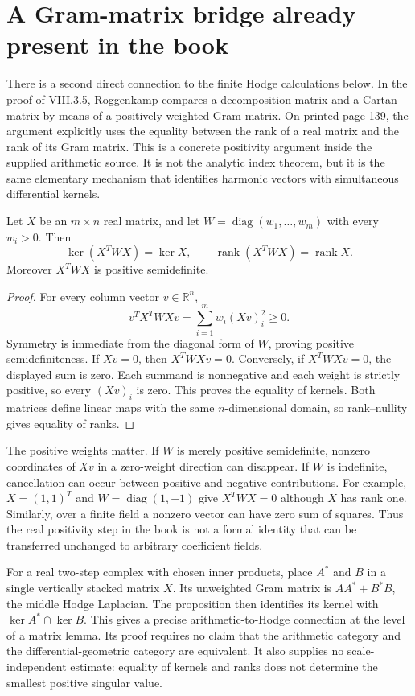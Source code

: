 \section{A Gram-matrix bridge already present in the book}

There is a second direct connection to the finite Hodge calculations below. In the proof of VIII.3.5, Roggenkamp compares a decomposition matrix and a Cartan matrix by means of a positively weighted Gram matrix. On printed page 139, the argument explicitly uses the equality between the rank of a real matrix and the rank of its Gram matrix. This is a concrete positivity argument inside the supplied arithmetic source. It is not the analytic index theorem, but it is the same elementary mechanism that identifies harmonic vectors with simultaneous differential kernels.\cite[Theorem VIII.3.5 and Exercise VIII.3.5]{v2Roggenkamp1970II}

\begin{proposition}
Let $X$ be an $m\times n$ real matrix, and let $W=\operatorname{diag}(w_1,\ldots,w_m)$ with every $w_i>0$. Then
\[
\ker(X^TWX)=\ker X,
\qquad
\operatorname{rank}(X^TWX)=\operatorname{rank}X.
\]
Moreover $X^TWX$ is positive semidefinite.
\end{proposition}
\begin{proof}
For every column vector $v\in\mathbb R^n$,
\[
v^TX^TWXv=\sum_{i=1}^m w_i(Xv)_i^2\geq0.
\]
Symmetry is immediate from the diagonal form of $W$, proving positive semidefiniteness. If $Xv=0$, then $X^TWXv=0$. Conversely, if $X^TWXv=0$, the displayed sum is zero. Each summand is nonnegative and each weight is strictly positive, so every $(Xv)_i$ is zero. This proves the equality of kernels. Both matrices define linear maps with the same $n$-dimensional domain, so rank--nullity gives equality of ranks.
\end{proof}

The positive weights matter. If $W$ is merely positive semidefinite, nonzero coordinates of $Xv$ in a zero-weight direction can disappear. If $W$ is indefinite, cancellation can occur between positive and negative contributions. For example, $X=(1,1)^T$ and $W=\operatorname{diag}(1,-1)$ give $X^TWX=0$ although $X$ has rank one. Similarly, over a finite field a nonzero vector can have zero sum of squares. Thus the real positivity step in the book is not a formal identity that can be transferred unchanged to arbitrary coefficient fields.

For a real two-step complex with chosen inner products, place $A^*$ and $B$ in a single vertically stacked matrix $X$. Its unweighted Gram matrix is $AA^*+B^*B$, the middle Hodge Laplacian. The proposition then identifies its kernel with $\ker A^*\cap\ker B$. This gives a precise arithmetic-to-Hodge connection at the level of a matrix lemma. Its proof requires no claim that the arithmetic category and the differential-geometric category are equivalent. It also supplies no scale-independent estimate: equality of kernels and ranks does not determine the smallest positive singular value.

